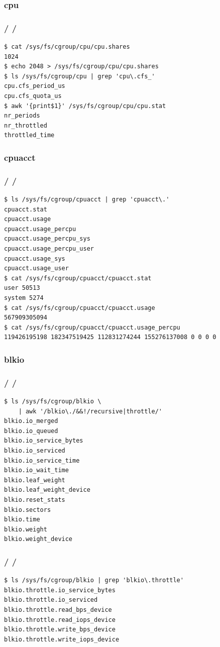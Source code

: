 \documentclass{beamer}
\newcommand{\autotitle}
{\frametitle{
    \secname
    \ifx\insertsubsection\empty
    \else
        /\subsecname
        \ifx\insertsubsubsection\empty\else/\subsubsecname\fi
    \fi}}
\begin{document}
\subsubsection{cpu}

\begin{frame}[fragile]
    \autotitle
    \begin{verbatim}
$ cat /sys/fs/cgroup/cpu/cpu.shares
1024
$ echo 2048 > /sys/fs/cgroup/cpu/cpu.shares
$ ls /sys/fs/cgroup/cpu | grep 'cpu\.cfs_'
cpu.cfs_period_us
cpu.cfs_quota_us
$ awk '{print$1}' /sys/fs/cgroup/cpu/cpu.stat
nr_periods
nr_throttled
throttled_time
    \end{verbatim}
\end{frame}

\subsubsection{cpuacct}

\begin{frame}[fragile]
    \autotitle
    \begin{verbatim}
$ ls /sys/fs/cgroup/cpuacct | grep 'cpuacct\.'
cpuacct.stat
cpuacct.usage
cpuacct.usage_percpu
cpuacct.usage_percpu_sys
cpuacct.usage_percpu_user
cpuacct.usage_sys
cpuacct.usage_user
$ cat /sys/fs/cgroup/cpuacct/cpuacct.stat
user 50513
system 5274
$ cat /sys/fs/cgroup/cpuacct/cpuacct.usage
567909305094
$ cat /sys/fs/cgroup/cpuacct/cpuacct.usage_percpu
119426195198 182347519425 112831274244 155276137008 0 0 0 0 
    \end{verbatim}
\end{frame}

\subsubsection{blkio}

\begin{frame}[fragile]
    \autotitle
    \begin{verbatim}
$ ls /sys/fs/cgroup/blkio \
    | awk '/blkio\./&&!/recursive|throttle/'
blkio.io_merged
blkio.io_queued
blkio.io_service_bytes
blkio.io_serviced
blkio.io_service_time
blkio.io_wait_time
blkio.leaf_weight
blkio.leaf_weight_device
blkio.reset_stats
blkio.sectors
blkio.time
blkio.weight
blkio.weight_device
    \end{verbatim}
\end{frame}

\begin{frame}[fragile]
    \autotitle
    \begin{verbatim}
$ ls /sys/fs/cgroup/blkio | grep 'blkio\.throttle'
blkio.throttle.io_service_bytes
blkio.throttle.io_serviced
blkio.throttle.read_bps_device
blkio.throttle.read_iops_device
blkio.throttle.write_bps_device
blkio.throttle.write_iops_device
    \end{verbatim}
\end{frame}
\end{document}
